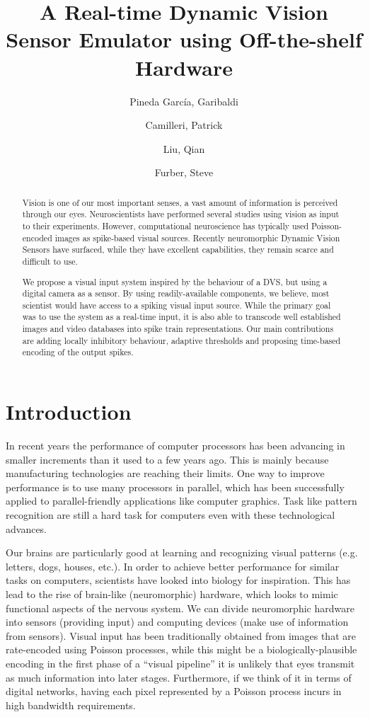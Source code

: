 \documentclass[twocolumn]{article}
\title{A Real-time Dynamic Vision Sensor Emulator using Off-the-shelf Hardware}
\author{Pineda García, Garibaldi \and Camilleri, Patrick \and Liu, Qian \and Furber, Steve}
\begin{document}
\maketitle
\begin{abstract}
\textsf{Vision is one of our most important senses, a vast amount of information is perceived through our eyes. Neuroscientists have performed several studies using vision as input to their experiments. However, computational neuroscience has typically used Poisson-encoded images as spike-based visual sources. Recently neuromorphic Dynamic Vision Sensors have surfaced, while they have excellent capabilities, they remain scarce and difficult to use.}


\textsf{
We propose a visual input system inspired by the behaviour of a DVS, but using a digital camera as a sensor. By using readily-available components, we believe, most scientist would have access to a spiking visual input source. While the primary goal was to use the system as a real-time input, it is also able to transcode well established images and video databases into spike train representations. Our main contributions are adding locally inhibitory behaviour, adaptive thresholds and proposing time-based encoding of the output spikes.}

\end{abstract}

\section{Introduction}

In recent years the performance of computer processors has been advancing in smaller increments than it used to a few years ago. This is mainly because manufacturing technologies are reaching their limits. One way to improve performance is to use many processors in parallel, which has been successfully applied to parallel-friendly applications like computer graphics. Task like pattern recognition are still a hard task for computers even with these technological advances.

Our brains are particularly good at learning and recognizing visual patterns (e.g. letters, dogs, houses, etc.). In order to achieve better performance for similar tasks on computers, scientists have looked into biology for inspiration. This has lead to the rise of brain-like (neuromorphic) hardware, which looks to mimic functional aspects of the nervous system. We can divide neuromorphic hardware into sensors (providing input) and computing devices (make use of information from sensors). Visual input has been traditionally obtained from images that are rate-encoded using Poisson processes, while this might be a biologically-plausible encoding in the first phase of a ``visual pipeline'' it is unlikely that eyes transmit as much information into later stages. Furthermore, if we think of it in terms of digital networks, having each pixel represented by a Poisson process incurs in high bandwidth requirements. 
\end{document}
